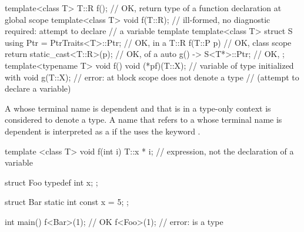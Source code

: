 \begin{example}
\begin{codeblock}
template<class T> T::R f();             // OK, return type of a function declaration at global scope
template<class T> void f(T::R);         // ill-formed, no diagnostic required: attempt to declare
                                        // a  variable template
template<class T> struct S {
  using Ptr = PtrTraits<T>::Ptr;        // OK, in a 
  T::R f(T::P p) {                      // OK, class scope
    return static_cast<T::R>(p);        // OK,  of a 
  }
  auto g() -> S<T*>::Ptr;               // OK, 
};
template<typename T> void f() {
  void (*pf)(T::X);                     // variable  of type  initialized with 
  void g(T::X);                         // error:  at block scope does not denote a type
                                        // (attempt to declare a  variable)
}
\end{codeblock}
\end{example}

\pnum
A 
whose terminal name is dependent and that is in a type-only context
is considered to denote a type.
A name
that refers to a  whose terminal name is dependent
is interpreted as a 
if the  uses the keyword .
\begin{example}
\begin{codeblock}
template <class T> void f(int i) {
  T::x * i;         // expression, not the declaration of a variable 
}

struct Foo {
  typedef int x;
};

struct Bar {
  static int const x = 5;
};

int main() {
  f<Bar>(1);        // OK
  f<Foo>(1);        // error:  is a type
}
\end{codeblock}
\end{example}

